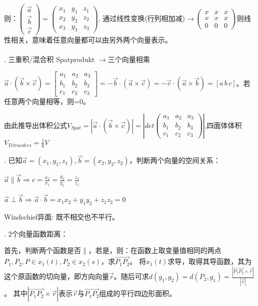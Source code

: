 \documentclass[fleqn]{article}
\begin{document}
则：$\begin{pmatrix}
    \vec{a}\\\vec{b}\\\vec{c}
\end{pmatrix}=\begin{pmatrix}
    x_1&y_1&z_1\\x_2&y_2&z_2\\x_3&y_3&z_3
\end{pmatrix}$, 通过线性变换(行列相加减)$\rightarrow\begin{pmatrix}
    x&x&x\\x&x&x\\0&0&0
\end{pmatrix}$则线性相关，意味着任意向量都可以由另外两个向量表示。
\\
\\
. 三重积/混合积 Spatprodukt $\rightarrow$三个向量相乘

$\vec{a}\cdot(\vec{b}\times\vec{c}) = \begin{bmatrix}
    a_1&a_2&a_3\\b_1&b_2&b_3\\c_1&c_2&c_3
\end{bmatrix}=-\vec{b}\cdot(\vec{a}\times\vec{c})=-\vec{c}\cdot(\vec{a}\times\vec{b})=[a\,b\,c]$。若任意两个向量相等，则=0。

由此推导出体积公式$V_{Spat}=|\vec{a}\cdot(\vec{b}\times\vec{c})|=\left| det\begin{pmatrix}
    a_1&a_2&a_3\\b_1&b_2&b_3\\c_1&c_2&c_3
\end{pmatrix}\right|$,四面体体积$V_{Tetraeders}=\frac{1}{6}V$

. 已知$\vec{a}=(x_1,y_1,z_1),\vec{b}=(x_2,y_2,z_2)$，判断两个向量的空间关系：

$\vec{a}\parallel\vec{b}\Rightarrow c=\frac{x_2}{x_1}=\frac{y_2}{y_1}=\frac{z_2}{z_1}$

$\vec{a}\perp\vec{b}\Rightarrow \vec{a}\cdot\vec{b}=x_1x_2+y_1y_2+z_1z_2=0$

Windschief异面: 既不相交也不平行。

. 2个向量函数距离：

首先，判断两个函数是否$\parallel$，若是，则：在函数上取变量值相同的两点$P_1,P_2,P\in x_1(t),P_2\in x_2(s)$，求$\overrightarrow{P_1P_2}$。
将$x_1(t)$求导，取得其导函数，其为这个原函数的切向量，即方向向量$\vec{r}$。随后可求$d(g_1,g_2)=d(P_2,g_1)=\frac{|\overrightarrow{P_1P_2}\times\vec{r}|}{|\vec{r}|}$。
其中$|\overrightarrow{P_1P_2}\times\vec{r}|$表示$\vec{r}$与$\overrightarrow{P_1P_2}$组成的平行四边形面积。
\end{document}
